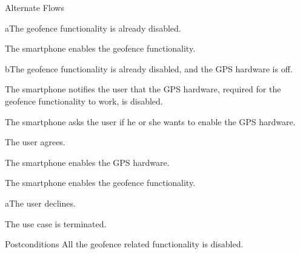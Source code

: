 %
\begin{cpartList}{Alternate Flows}
  \begin{innerList}{5}{a}{The geofence functionality is already disabled.}
    \item The smartphone enables the geofence functionality.
  \end{innerList}
  \begin{innerList}{5}{b}{The geofence functionality is already disabled, and the GPS hardware is off.}
    \item The smartphone notifies the user that the GPS hardware, required for the geofence functionality to work, is disabled.
    \item The smartphone asks the user if he or she wants to enable the GPS hardware.
    \item The user agrees.
    \item The smartphone enables the GPS hardware.
    \item The smartphone enables the geofence functionality.
    \begin{innerList}{3}{a}{The user declines.}
      \item The use case is terminated.
    \end{innerList}
  \end{innerList}
\end{cpartList}

%
\begin{cpart}{Postconditions}
All the geofence related functionality is disabled.
\end{cpart}

\clearpage
